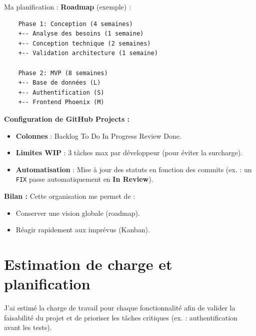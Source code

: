 \begin{for_you}{Ma planification :}
    \textbf{Roadmap} (exemple) :
    \begin{verbatim}
    Phase 1: Conception (4 semaines)
    +-- Analyse des besoins (1 semaine)
    +-- Conception technique (2 semaines)
    +-- Validation architecture (1 semaine)

    Phase 2: MVP (8 semaines)
    +-- Base de données (L)
    +-- Authentification (S)
    +-- Frontend Phoenix (M)
    \end{verbatim}

    \textbf{Configuration de GitHub Projects :} 
    \begin{itemize}
        \item \textbf{Colonnes} : Backlog \myarrow To Do \myarrow In Progress \myarrow Review \myarrow Done.
        \item \textbf{Limites WIP} : 3 tâches max par développeur (pour éviter la surcharge).
        \item \textbf{Automatisation} : Mise à jour des statuts en fonction des commits (ex. : un \texttt{FIX} passe automatiquement en \textbf{In Review}).
        \newline
    \end{itemize}

    \textbf{Bilan :\newline}
    Cette organisation me permet de :
    \begin{itemize}
        \item Conserver une vision globale (roadmap).
        \item Réagir rapidement aux imprévus (Kanban).
    \end{itemize}
\end{for_you}

\section{Estimation de charge et planification}

J’ai estimé la charge de travail pour chaque fonctionnalité afin de valider la faisabilité du projet et de prioriser les tâches critiques (ex. : authentification avant les tests). 
\newline

